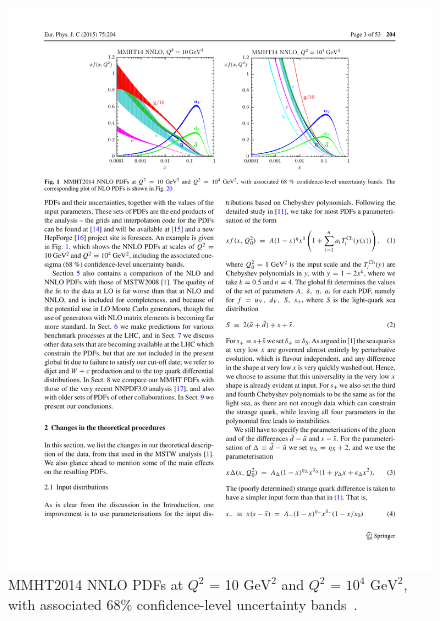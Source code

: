 
\begin{figure}[!b]
  \begin{center}
    \includegraphics[width=1\linewidth, angle=0]{figs/Theory/qcd_pdf.pdf}
  \end{center}
  \caption[MMHT2014 NNLO PDFs at $Q^2$ = 10 $\text{GeV}^2$ and $Q^2$ = $10^4$ $\text{GeV}^2$, with associated 68\% confidence-level uncertainty bands.]
  {MMHT2014 NNLO PDFs at $Q^2$ = 10 $\text{GeV}^2$ and $Q^2$ = $10^4$ $\text{GeV}^2$, with associated 68\% confidence-level uncertainty bands~\cite{theo-qcd_pdf}.}
  \label{fig:theo-qcd_pdf}
\end{figure}


